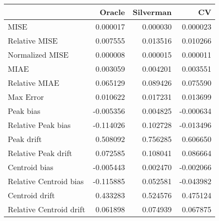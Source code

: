 \begin{tabular}{lrrr}
  \hline
 & Oracle & Silverman & CV \\ 
  \hline
MISE & 0.000017 & 0.000030 & 0.000023 \\ 
  Relative MISE & 0.007555 & 0.013516 & 0.010266 \\ 
  Normalized MISE & 0.000008 & 0.000015 & 0.000011 \\ 
  MIAE & 0.003059 & 0.004201 & 0.003551 \\ 
  Relative MIAE & 0.065129 & 0.089426 & 0.075590 \\ 
  Max Error & 0.010622 & 0.017231 & 0.013699 \\ 
  Peak bias & -0.005356 & 0.004825 & -0.000634 \\ 
  Relative Peak bias & -0.114026 & 0.102728 & -0.013496 \\ 
  Peak drift & 0.508092 & 0.756285 & 0.606650 \\ 
  Relative Peak drift & 0.072585 & 0.108041 & 0.086664 \\ 
  Centroid bias & -0.005443 & 0.002470 & -0.002066 \\ 
  Relative Centroid bias & -0.115885 & 0.052581 & -0.043982 \\ 
  Centroid drift & 0.433283 & 0.524576 & 0.475124 \\ 
  Relative Centroid drift & 0.061898 & 0.074939 & 0.067875 \\ 
   \hline
\end{tabular}
